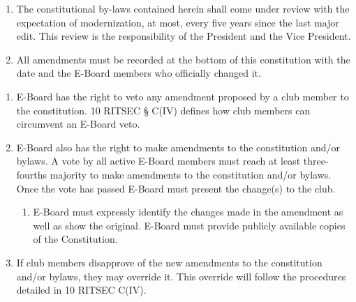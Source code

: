 


\begin{enumerate}
      \item The constitutional by-laws contained herein shall come under review with the
            expectation of modernization, at most, every five years since the last major
            edit. This review is the responsibility of the President and the Vice
            President.
      \item All amendments must be recorded at the bottom of this constitution with the
            date and the E-Board members who officially changed it.
\end{enumerate}


\begin{enumerate}
      \item E-Board has the right to veto any amendment proposed by a club member to the
            constitution. 10 RITSEC § C(IV) defines how club members can circumvent an
            E-Board veto.

      \item E-Board also has the right to make amendments to the constitution and/or
            bylaws. A vote by all active E-Board members must reach at least three-fourths
            majority to make amendments to the constitution and/or bylaws. Once the vote
            has passed E-Board must present the change(s) to the club.
            \begin{enumerate}
                  \item E-Board must expressly identify the changes made in the amendment as well as
                        show the original. E-Board must provide publicly available copies of the
                        Constitution.
            \end{enumerate}
      \item If club members disapprove of the new amendments to the constitution and/or
            bylaws, they may override it. This override will follow the procedures detailed
            in 10 RITSEC C(IV).
\end{enumerate}

